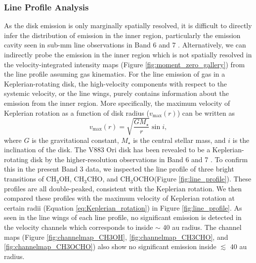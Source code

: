 \documentclass[linenumbers, twocolumn, twocolappendix, astrosymb, times]{aastex631}
\newcommand{\methanol}{CH$_3$OH\xspace}
\newcommand{\acetaldehyde}{CH$_3$CHO\xspace}
\newcommand{\methylformate}{CH$_3$OCHO\xspace}
\begin{document}
\subsubsection{Line Profile Analysis}\label{subsubsec:line_profile_analysis}
As the disk emission is only marginally spatially resolved, it is difficult to directly infer the distribution of emission in the inner region, particularly the emission cavity seen in sub-mm line observations in Band 6 and 7 \citep{vantHoff2018, Lee2019, Tobin2023}. Alternatively, we can indirectly probe the emission in the inner region which is not spatially resolved in the velocity-integrated intensity maps (Figure \ref{fig:moment_zero_gallery}) from the line profile assuming gas kinematics. 
For the line emission of gas in a Keplerian-rotating disk, the high-velocity components with respect to the systemic velocity, or the line wings, purely contains information about the emission from the inner region. More specifically, the maximum velocity of Keplerian rotation as a function of disk radius ($v_\mathrm{max}(r)$) can be written as 
\begin{equation}\label{eq:Keplerian_rotation}
    v_\mathrm{max}(r) = \sqrt{\frac{GM_\star}{r}}\sin i,
\end{equation}
where $G$ is the gravitational constant, $M_\star$ is the central stellar mass, and $i$ is the inclination of the disk. The V883 Ori disk has been revealed to be a Keplerian-rotating disk by the higher-resolution observations in Band 6 and 7 \citep{Cieza2016, Lee2019}. To confirm this in the present Band 3 data, we inspected the line profile of three bright transitions of \methanol, \acetaldehyde, and \methylformate (Figure \ref{fig:line_profile}). These profiles are all double-peaked, consistent with the Keplerian rotation. We then compared these profiles with the maximum velocity of Keplerian rotation at certain radii (Equation \ref{eq:Keplerian_rotation}) in Figure \ref{fig:line_profile}. As seen in the line wings of each line profile, no significant emission is detected in the velocity channels which corresponds to inside $\sim$ 40 au radius. The channel maps (Figure \ref{fig:channelmap_CH3OH}, \ref{fig:channelmap_CH3CHO}, and \ref{fig:channelmap_CH3OCHO}) also show no significant emission inside $\lesssim$ 40 au radius. 


\begin{figure*}
\caption{Line profiles of \methanol $2_{-1,1}$ -- $1_{-1,0}$ E $v_t=0$, \acetaldehyde $5_{2,3}$ -- $4_{2,2}$ E $v_t=0$, and \methylformate $7_{6,1}$ -- $6_{6,0}$ E $v_t=0$. The vertical dotted line marks the systemic velocity (4.25 km s$^{-1}$). The vertical blue-ish dashed lines indicates the corresponding disk radii at each channel based on the maximum velocity of Keplerian rotation in Equation (\ref{eq:Keplerian_rotation}). The horizontal dashed line indicates the zero-flux level. There are no significant detection of emission in the channels which corresponds to inside $\sim$ 40\,au radius.}
\label{fig:line_profile}
\end{figure*}
\end{document}
